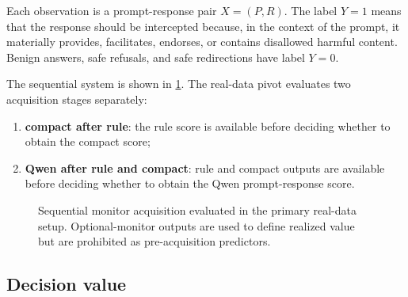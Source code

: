 \documentclass[11pt,a4paper]{article}
\begin{document}
Each observation is a prompt-response pair $X=(P,R)$. The label $Y=1$ means that the response should be intercepted because, in the context of the prompt, it materially provides, facilitates, endorses, or contains disallowed harmful content. Benign answers, safe refusals, and safe redirections have label $Y=0$.

The sequential system is shown in \cref{fig:pipeline}. The real-data pivot evaluates two acquisition stages separately:

\begin{enumerate}
  \item \textbf{compact after rule}: the rule score is available before deciding whether to obtain the compact score;
  \item \textbf{Qwen after rule and compact}: rule and compact outputs are available before deciding whether to obtain the Qwen prompt-response score.
\end{enumerate}

\begin{figure}[htbp]
\centering
{}
\caption{Sequential monitor acquisition evaluated in the primary real-data setup. Optional-monitor outputs are used to define realized value but are prohibited as pre-acquisition predictors.}
\label{fig:pipeline}
\end{figure}

\subsection{Decision value}
\end{document}
